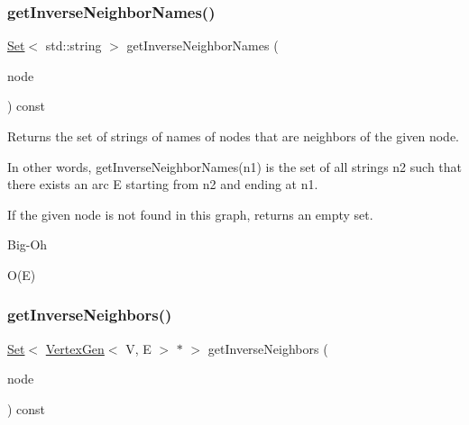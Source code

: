 \subsubsection{\texorpdfstring{get\+Inverse\+Neighbor\+Names()}{getInverseNeighborNames()}\hspace{0.1cm}{\footnotesize\ttfamily [2/2]}}
{\footnotesize\ttfamily \mbox{\hyperlink{classstanfordcpplib_1_1collections_1_1GenericSet}{Set}}$<$ std\+::string $>$ get\+Inverse\+Neighbor\+Names (\begin{DoxyParamCaption}\item[{const std\+::string \&}]{node }\end{DoxyParamCaption}) const\hspace{0.3cm}{\ttfamily [inherited]}}



Returns the set of strings of names of nodes that are neighbors of the given node. 

In other words, get\+Inverse\+Neighbor\+Names(n1) is the set of all strings n2 such that there exists an arc E starting from n2 and ending at n1.

If the given node is not found in this graph, returns an empty set. \begin{DoxyRefDesc}{Big-\/\+Oh}
\item[\mbox{\hyperlink{BigOh__BigOh000068}{Big-\/\+Oh}}]O(\+E) \end{DoxyRefDesc}
\mbox{\label{classGraph_a80a5724c594b9bd0b6008c57b09af317}} 
\subsubsection{\texorpdfstring{get\+Inverse\+Neighbors()}{getInverseNeighbors()}\hspace{0.1cm}{\footnotesize\ttfamily [1/2]}}
{\footnotesize\ttfamily \mbox{\hyperlink{classstanfordcpplib_1_1collections_1_1GenericSet}{Set}}$<$ \mbox{\hyperlink{classVertexGen}{Vertex\+Gen}}$<$ V, E $>$  $\ast$ $>$ get\+Inverse\+Neighbors (\begin{DoxyParamCaption}\item[{\mbox{\hyperlink{classVertexGen}{Vertex\+Gen}}$<$ V, E $>$  $\ast$}]{node }\end{DoxyParamCaption}) const\hspace{0.3cm}{\ttfamily [inherited]}}




